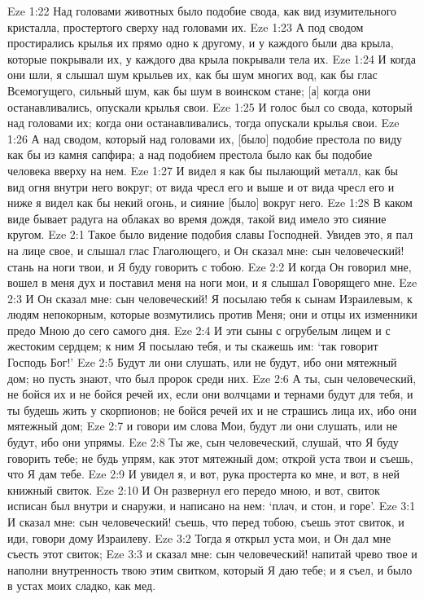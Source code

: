 Eze 1:22  Над головами животных было подобие свода, как вид изумительного кристалла, простертого сверху над головами их.
Eze 1:23  А под сводом простирались крылья их прямо одно к другому, и у каждого были два крыла, которые покрывали их, у каждого два крыла покрывали тела их.
Eze 1:24  И когда они шли, я слышал шум крыльев их, как бы шум многих вод, как бы глас Всемогущего, сильный шум, как бы шум в воинском стане; [а] когда они останавливались, опускали крылья свои.
Eze 1:25  И голос был со свода, который над головами их; когда они останавливались, тогда опускали крылья свои.
Eze 1:26  А над сводом, который над головами их, [было] подобие престола по виду как бы из камня сапфира; а над подобием престола было как бы подобие человека вверху на нем.
Eze 1:27  И видел я как бы пылающий металл, как бы вид огня внутри него вокруг; от вида чресл его и выше и от вида чресл его и ниже я видел как бы некий огонь, и сияние [было] вокруг него.
Eze 1:28  В каком виде бывает радуга на облаках во время дождя, такой вид имело это сияние кругом.
Eze 2:1  Такое было видение подобия славы Господней. Увидев это, я пал на лице свое, и слышал глас Глаголющего, и Он сказал мне: сын человеческий! стань на ноги твои, и Я буду говорить с тобою.
Eze 2:2  И когда Он говорил мне, вошел в меня дух и поставил меня на ноги мои, и я слышал Говорящего мне.
Eze 2:3  И Он сказал мне: сын человеческий! Я посылаю тебя к сынам Израилевым, к людям непокорным, которые возмутились против Меня; они и отцы их изменники предо Мною до сего самого дня.
Eze 2:4  И эти сыны с огрубелым лицем и с жестоким сердцем; к ним Я посылаю тебя, и ты скажешь им: `так говорит Господь Бог!'
Eze 2:5  Будут ли они слушать, или не будут, ибо они мятежный дом; но пусть знают, что был пророк среди них.
Eze 2:6  А ты, сын человеческий, не бойся их и не бойся речей их, если они волчцами и тернами будут для тебя, и ты будешь жить у скорпионов; не бойся речей их и не страшись лица их, ибо они мятежный дом;
Eze 2:7  и говори им слова Мои, будут ли они слушать, или не будут, ибо они упрямы.
Eze 2:8  Ты же, сын человеческий, слушай, что Я буду говорить тебе; не будь упрям, как этот мятежный дом; открой уста твои и съешь, что Я дам тебе.
Eze 2:9  И увидел я, и вот, рука простерта ко мне, и вот, в ней книжный свиток.
Eze 2:10  И Он развернул его передо мною, и вот, свиток исписан был внутри и снаружи, и написано на нем: `плач, и стон, и горе'.
Eze 3:1  И сказал мне: сын человеческий! съешь, что перед тобою, съешь этот свиток, и иди, говори дому Израилеву.
Eze 3:2  Тогда я открыл уста мои, и Он дал мне съесть этот свиток;
Eze 3:3  и сказал мне: сын человеческий! напитай чрево твое и наполни внутренность твою этим свитком, который Я даю тебе; и я съел, и было в устах моих сладко, как мед.
